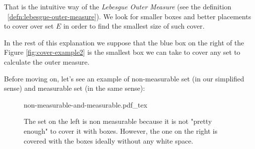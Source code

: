 \documentclass[a4paper]{article}
\newcommand{\incfig}[1]{%
    \def\svgwidth{\columnwidth}
    {#1.pdf_tex}
}
\begin{document}
That is the intuitive way of the \textit{Lebesgue Outer Measure} (see the
definition ~\ref{defn:lebesgue-outer-measure}). We look for smaller boxes and
better placements to cover over set $E$ in order to find the smallest size of
such cover.

In the rest of this explanation we suppose that the blue box on the right of
the Figure \ref{fig:cover-example2} is the smallest box we can take to cover any set
to calculate the outer measure.

Before moving on, let's see an example of non-measurable set (in our simplified
sense) and measurable set (in the same sense):
\begin{figure}[H]
    \centering
    \incfig{non-measurable-and-measurable}
    \caption{The set on the left is non measurable because it is not "pretty
    enough" to cover it with boxes. However, the one on the right is covered
with the boxes ideally without any white space.}
    \label{fig:non-measurable-and-measurable}
\end{figure}
\end{document}
